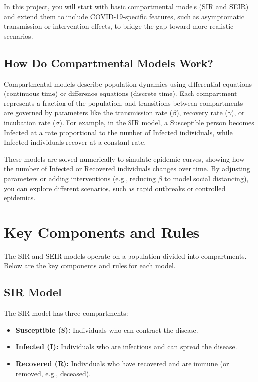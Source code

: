 \documentclass{article}
\begin{document}
In this project, you will start with basic compartmental models (SIR and SEIR) and extend them to include COVID-19-specific features, such as asymptomatic transmission or intervention effects, to bridge the gap toward more realistic scenarios.

\subsection{How Do Compartmental Models Work?}

Compartmental models describe population dynamics using differential equations (continuous time) or difference equations (discrete time). Each compartment represents a fraction of the population, and transitions between compartments are governed by parameters like the transmission rate ($\beta$), recovery rate ($\gamma$), or incubation rate ($\sigma$). For example, in the SIR model, a Susceptible person becomes Infected at a rate proportional to the number of Infected individuals, while Infected individuals recover at a constant rate.

These models are solved numerically to simulate epidemic curves, showing how the number of Infected or Recovered individuals changes over time. By adjusting parameters or adding interventions (e.g., reducing $\beta$ to model social distancing), you can explore different scenarios, such as rapid outbreaks or controlled epidemics.

\section{Key Components and Rules}

The SIR and SEIR models operate on a population divided into compartments. Below are the key components and rules for each model.

\subsection{SIR Model}
The SIR model has three compartments:
\begin{itemize}
    \item \textbf{Susceptible (S):} Individuals who can contract the disease.
    \item \textbf{Infected (I):} Individuals who are infectious and can spread the disease.
    \item \textbf{Recovered (R):} Individuals who have recovered and are immune (or removed, e.g., deceased).
\end{itemize}
\end{document}
